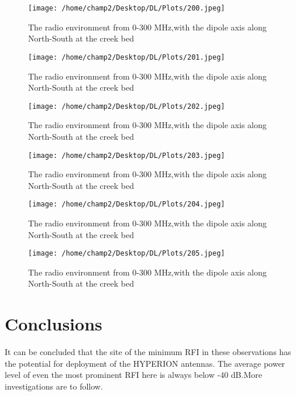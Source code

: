 \documentclass[11pt]{article}
\begin{document}
\begin{figure}
    \begin{center}
    \texttt{[image: /home/champ2/Desktop/DL/Plots/200.jpeg]}
    \end{center}
    \caption{
        The radio environment from 0-300 MHz,with the dipole axis along North-South at the creek bed
    }
    \label{fig:200}
\end{figure}
\begin{figure}
    \begin{center}
    \texttt{[image: /home/champ2/Desktop/DL/Plots/201.jpeg]}
    \end{center}
    \caption{
        The radio environment from 0-300 MHz,with the dipole axis along North-South at the creek bed
    }
    \label{fig:201}
\end{figure}
\begin{figure}
    \begin{center}
    \texttt{[image: /home/champ2/Desktop/DL/Plots/202.jpeg]}
    \end{center}
    \caption{
        The radio environment from 0-300 MHz,with the dipole axis along North-South at the creek bed
    }
    \label{fig:202}
\end{figure}
\begin{figure}
    \begin{center}
    \texttt{[image: /home/champ2/Desktop/DL/Plots/203.jpeg]}
    \end{center}
    \caption{
        The radio environment from 0-300 MHz,with the dipole axis along North-South at the creek bed
    }
    \label{fig:203}
\end{figure}
\begin{figure}
    \begin{center}
    \texttt{[image: /home/champ2/Desktop/DL/Plots/204.jpeg]}
    \end{center}
    \caption{
        The radio environment from 0-300 MHz,with the dipole axis along North-South at the creek bed
    }
    \label{fig:204}
\end{figure}
\begin{figure}
    \begin{center}
    \texttt{[image: /home/champ2/Desktop/DL/Plots/205.jpeg]}
    \end{center}
    \caption{
        The radio environment from 0-300 MHz,with the dipole axis along North-South at the creek bed
    }
    \label{fig:205}
\end{figure}






\section{Conclusions}

It can be concluded that the site of the minimum RFI in these observations has the potential for deployment of the HYPERION antennas. The average power level of even the most prominent RFI here is always below -40 dB.More investigations are to follow.

{}

\end{document}
